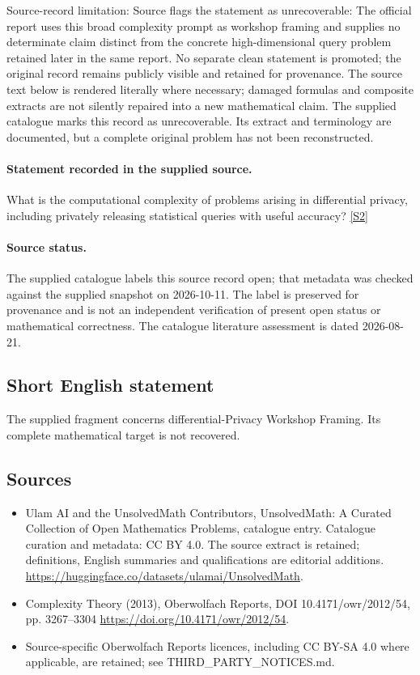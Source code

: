 \documentclass[11pt]{article}
\begin{document}
Source-record limitation: Source flags the statement as unrecoverable: The official report uses this broad complexity prompt as workshop framing and supplies no determinate claim distinct from the concrete high-dimensional query problem retained later in the same report. No separate clean statement is promoted; the original record remains publicly visible and retained for provenance.
The source text below is rendered literally where necessary; damaged formulas and composite extracts are not silently repaired into a new mathematical claim.
The supplied catalogue marks this record as unrecoverable. Its extract and terminology are documented, but a complete original problem has not been reconstructed.
\paragraph{Statement recorded in the supplied source.}
What is the computational complexity of problems arising in differential privacy, including privately releasing statistical queries with useful accuracy? \href{https://doi.org/10.4171/owr/2012/54}{[S2]}
\paragraph{Source status.}
The supplied catalogue labels this source record open; that metadata was checked against the supplied snapshot on 2026-10-11. The label is preserved for provenance and is not an independent verification of present open status or mathematical correctness. The catalogue literature assessment is dated 2026-08-21.
\subsection{Short English statement}
The supplied fragment concerns differential-Privacy Workshop Framing. Its complete mathematical target is not recovered.
\subsection{Sources}
\begin{itemize}
\item[S1] Ulam AI and the UnsolvedMath Contributors, UnsolvedMath: A Curated Collection of Open Mathematics Problems, catalogue entry. Catalogue curation and metadata: CC BY 4.0. The source extract is retained; definitions, English summaries and qualifications are editorial additions.
\url{https://huggingface.co/datasets/ulamai/UnsolvedMath}.
\item[S2] Complexity Theory (2013), Oberwolfach Reports, DOI 10.4171/owr/2012/54, pp. 3267--3304
\url{https://doi.org/10.4171/owr/2012/54}.
\item Source-specific Oberwolfach Reports licences, including CC BY-SA 4.0 where applicable, are retained; see THIRD\_PARTY\_NOTICES.md.
\end{itemize}
\end{document}
